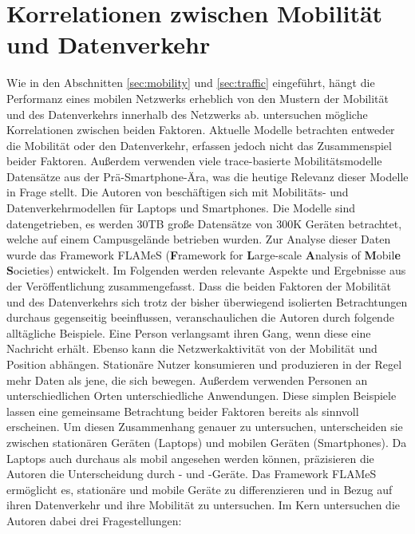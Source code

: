 \documentclass[12pt, a4paper]{article}
\begin{document}
\section{Korrelationen zwischen Mobilität und Datenverkehr}
\label{sec:correlations}

Wie in den Abschnitten \ref{sec:mobility} und \ref{sec:traffic} eingeführt, hängt die Performanz eines mobilen
Netzwerks erheblich von den Mustern der Mobilität und des Datenverkehrs innerhalb des Netzwerks ab.
\cite{Alipour2018} untersuchen mögliche Korrelationen zwischen beiden Faktoren.
\newline\newline
Aktuelle Modelle betrachten entweder die Mobilität oder den Datenverkehr, erfassen jedoch nicht das Zusammenspiel beider Faktoren.
Außerdem verwenden viele trace-basierte Mobilitätsmodelle Datensätze aus der Prä-Smartphone-Ära,
was die heutige Relevanz dieser Modelle in Frage stellt. \cite{Alipour2018}\newline
Die Autoren von \cite{Alipour2018} beschäftigen sich mit Mobilitäts- und Datenverkehrmodellen für Laptops und Smartphones.
Die Modelle sind datengetrieben, es werden $30$\textsc{TB} große Datensätze von $300$\textsc{K} Geräten betrachtet, 
welche auf einem Campusgelände betrieben wurden. Zur Analyse dieser Daten wurde das Framework FLAMeS (\textbf{F}ramework for 
\textbf{L}arge-scale \textbf{A}nalysis of \textbf{M}obil\textbf{e} \textbf{S}ocieties) entwickelt.
Im Folgenden werden relevante Aspekte und Ergebnisse aus der Veröffentlichung zusammengefasst.\newline\newline
Dass die beiden Faktoren der Mobilität und des Datenverkehrs sich trotz der bisher überwiegend isolierten Betrachtungen
durchaus gegenseitig beeinflussen, veranschaulichen die Autoren durch folgende alltägliche Beispiele. 
Eine Person verlangsamt ihren Gang, wenn diese eine Nachricht erhält. Ebenso kann die Netzwerkaktivität von der
Mobilität und Position abhängen. Stationäre Nutzer konsumieren und produzieren in der Regel mehr Daten als jene, 
die sich bewegen. Außerdem verwenden Personen an unterschiedlichen Orten unterschiedliche Anwendungen.
Diese simplen Beispiele lassen eine gemeinsame Betrachtung beider Faktoren bereits als sinnvoll erscheinen.
Um diesen Zusammenhang genauer zu untersuchen, unterscheiden sie zwischen stationären Geräten (Laptops) und mobilen Geräten
(Smartphones). Da Laptops auch durchaus als mobil angesehen werden können, präzisieren die Autoren die Unterscheidung
durch - und -Geräte. Das Framework FLAMeS ermöglicht es, stationäre und
mobile Geräte zu differenzieren und in Bezug auf ihren Datenverkehr und ihre Mobilität zu untersuchen.
Im Kern untersuchen die Autoren dabei drei Fragestellungen:
\end{document}
